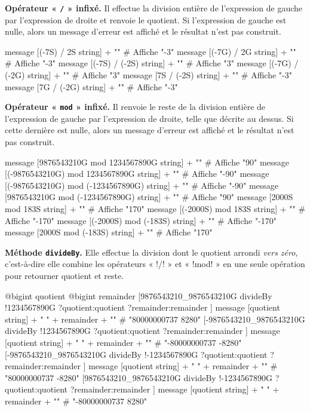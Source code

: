 \textbf{Opérateur « \texttt{/} » infixé.} Il effectue la division entière de l'expression de gauche par l'expression de droite et renvoie le quotient. Si l'expression de gauche est nulle, alors un message d'erreur est affiché et le résultat n'est pas construit.

\begin{galgas}
  message [(-7S) / 2S string] + "\n" # Affiche "-3"
  message [(-7G) / 2G string] + "\n" # Affiche "-3"
  message [(-7S) / (-2S) string] + "\n" # Affiche "3"
  message [(-7G) / (-2G) string] + "\n" # Affiche "3"
  message [7S / (-2S) string] + "\n" # Affiche "-3"
  message [7G / (-2G) string] + "\n" # Affiche "-3"
\end{galgas}



\textbf{Opérateur « \texttt{mod} » infixé.} Il renvoie le reste de la division entière de l'expression de gauche par l'expression de droite, telle que décrite au dessus. Si cette dernière est nulle, alors un message d'erreur est affiché et le résultat n'est pas construit.

\begin{galgas}
  message [9876543210G mod 1234567890G string] + "\n" # Affiche "90"
  message [(-9876543210G) mod 1234567890G string] + "\n" # Affiche "-90"
  message [(-9876543210G) mod (-1234567890G) string] + "\n"  # Affiche "-90"
  message [9876543210G mod (-1234567890G) string] + "\n"  # Affiche "90"
  message [2000S mod 183S string] + "\n" # Affiche "170"
  message [(-2000S) mod 183S string] + "\n" # Affiche "-170"
  message [(-2000S) mod (-183S) string] + "\n" # Affiche "-170"
  message [2000S mod (-183S) string] + "\n" # Affiche "170"
\end{galgas}




\textbf{Méthode \texttt{divideBy}.} Elle effectue la division dont le quotient arrondi \emph{vers zéro}, c'est-à-dire elle combine les opérateurs « \ggs!/! » et « \ggs!mod! » en une seule opération pour retourner quotient et reste.

\begin{galgas}
  @bigint quotient
  @bigint remainder
  [9876543210_9876543210G divideBy
    !1234567890G
    ?quotient:quotient
    ?remainder:remainder
  ]
  message [quotient string] + " " + remainder + "\n" # "80000000737 8280"
  [-9876543210_9876543210G divideBy
    !1234567890G
    ?quotient:quotient
    ?remainder:remainder
  ]
  message [quotient string] + " " + remainder + "\n" # "-80000000737 -8280"
  [-9876543210_9876543210G divideBy
    !-1234567890G
    ?quotient:quotient
    ?remainder:remainder
  ]
  message [quotient string] + " " + remainder + "\n" # "80000000737 -8280"
  [9876543210_9876543210G divideBy
    !-1234567890G
    ?quotient:quotient
    ?remainder:remainder
  ]
  message [quotient string] + " " + remainder + "\n" # "-80000000737 8280"
\end{galgas}





